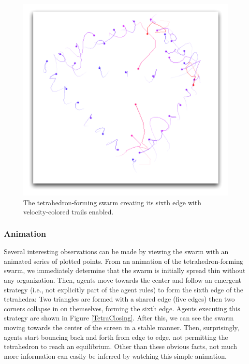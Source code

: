 \documentclass{vgtc}
\begin{document}
\begin{figure}
\centering
\includegraphics[scale=.55]{images/tetrastrategy.pdf}
\caption{
The tetrahedron-forming swarm creating its sixth edge with velocity-colored trails enabled.
}
\label{TetraStrategy}
\end{figure}

\subsubsection{Animation}

Several interesting observations can be made by viewing the swarm with an animated series of plotted points.
From an animation of the tetrahedron-forming swarm,
we immediately determine that the swarm is initially spread thin without any organization.
Then, agents move towards the center and follow an emergent strategy (i.e., not explicitly part of the agent rules)
to form the sixth edge of the tetrahedra: Two triangles are formed with a shared edge (five edges) then two corners collapse in on themselves, forming the sixth edge. Agents executing this strategy are shown in Figure \ref{TetraClosing}.
After this, we can see the swarm moving towards the center of the screen in a stable manner.
Then, surprisingly, agents start bouncing back and forth from edge to edge, not permitting the tetrahedron to
reach an equilibrium. Other than these obvious facts, not much more information can easily be inferred by watching this simple animation.
\end{document}
